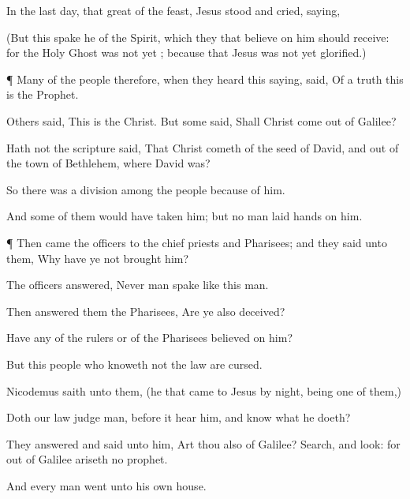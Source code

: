 {In the
last
day,
that
great
{} of the
feast,
Jesus
stood
and
cried,
saying,
{}


(But
this spake
he
of the
Spirit,
which they that
believe
on
him
should
receive:
for
the
Holy
Ghost
was not
yet
{}; because
that
Jesus
was not
yet
glorified.)


\par }{\PP {}¶
Many
of the
people
therefore, when they
heard this
saying,
said, Of a
truth
this
is the
Prophet.

Others
said,
This
is the
Christ.
But
some
said,
Shall
Christ
come out
of
Galilee?

Hath
not the
scripture
said,
That
Christ
cometh
of the
seed of
David,
and
out of the
town of
Bethlehem,
where
David
was?

So there
was a
division
among the
people
because of
him.

And
some
of
them would
have
taken
him;
but no
man
laid
hands
on
him.


\par }{\PP {}¶
Then
came the
officers
to the chief
priests
and
Pharisees;
and
they
said unto
them,
Why have
ye
not
brought
him?

The
officers
answered,
Never
man
spake
like
this
man.

Then
answered
them the
Pharisees,
Are
ye
also
deceived?

Have
any
of the
rulers
or
of the
Pharisees
believed
on
him?

But
this
people who
knoweth
not the
law
are
cursed.

Nicodemus
saith
unto
them, (he that
came
to
Jesus by
night,
being
one
of
them,)

Doth
our
law
judge
{}
man,
before it
hear
him,
and
know
what he
doeth?

They
answered
and
said unto
him,
Art
thou
also
of
Galilee?
Search,
and
look:
for out
of
Galilee
ariseth
no
prophet.

And every
man
went
unto his
own
house.




\par }
